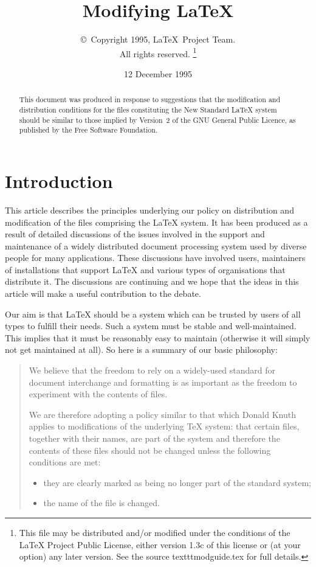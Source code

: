 \documentclass{ltxguide}[1995/11/28]
\title{Modifying \LaTeX}
\author{\copyright~Copyright 1995, \LaTeX\ Project Team.\\
   All rights reserved.%
   \footnote{This file may be distributed and/or modified under the
     conditions of the \LaTeX{} Project Public License, either version 1.3c
     of this license or (at your option) any later version. See the source
     texttt{modguide.tex} for full details.}%
}
\date{12 December 1995}
\begin{document}
\maketitle

\tableofcontents

\begin{abstract}
  This document was produced in response to suggestions that the
  modification and distribution conditions for the files constituting
  the New Standard \LaTeX{} system should be similar to those implied
  by Version~2 of the \textsc{GNU} General Public Licence, as
  published by the Free Software Foundation.
\end{abstract}

\section{Introduction}
\label{sec:intro}

This article describes the principles underlying our policy on
distribution and modification of the files comprising the \LaTeX{}
system.  It has been produced as a result of detailed discussions of
the issues involved in the support and maintenance of a widely
distributed document processing system used by diverse people for many
applications.  These discussions have involved users, maintainers of
installations that support \LaTeX{} and various types of organisations
that distribute it.  The discussions are continuing and we hope that
the ideas in this article will make a useful contribution to the
debate.

Our aim is that \LaTeX{} should be a system which can be trusted by
users of all types to fulfill their needs.  Such a system must be
stable and well-maintained.  This implies that it must be reasonably
easy to maintain (otherwise it will simply not get maintained at
all).  So here is a summary of our basic philosophy:
\begin{quote}
  We believe that the freedom to rely on a widely-used standard for
  document interchange and formatting is as important as the freedom to
  experiment with the contents of files.

  We are therefore adopting a policy similar to that which Donald
  Knuth applies to modifications of the underlying \TeX{} system: that
  certain files, together with their names, are part of the system and
  therefore the contents of these files should not be changed unless
  the following conditions are met:
  \begin{itemize}
  \item they are clearly marked as being no longer part of the
    standard system;
  \item the name of the file is changed.
  \end{itemize}
\end{quote}
\end{document}
